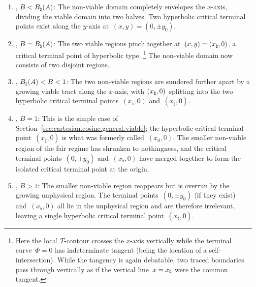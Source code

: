\begin{enumerate}
  \item
    \label{itm:cartesian.cosine.general.cases.gentle}
    , $B < B_\natural (A)$:
    The non-viable domain completely envelopes the $x$-axis,
    dividing the viable domain into two halves.
    Two hyperbolic critical terminal points exist along the $y$-axis
    at~$(x, y) = (0, \pm y_0)$.
  \item
    \label{itm:cartesian.cosine.general.cases.gentle-to-fair}
    , $B = B_\natural (A)$:
    The two viable regions pinch together at~$(x, y) = (x_\natural, 0)$,
    a critical terminal point of hyperbolic type.%
    \footnote{
      Here the local $T$-contour crosses the $x$-axis vertically
      while the terminal curve~$\Phi = 0$ has indeterminate tangent
      (being the location of a self-intersection).
      While the tangency is again debatable,
      two traced boundaries pass through vertically
      as if the vertical line~$x = x_\natural$ were the common tangent.
    }
    The non-viable domain now consists of two disjoint regions.
  \item
    \label{itm:cartesian.cosine.general.cases.fair}
    , $B_\natural (A) < B < 1$:
    The two non-viable regions are sundered further apart
    by a growing viable tract along the $x$-axis,
    with $(x_\natural, 0)$~splitting into the two
    hyperbolic critical terminal points~$(x_\flat, 0)$ and~$(x_\sharp, 0)$.
  \item
    \label{itm:cartesian.cosine.general.cases.fair-to-steep}
    , $B = 1$:
    This is the simple case
    of Section~\ref{sec:cartesian.cosine.general.viable};
    the hyperbolic critical terminal point~$(x_\sharp, 0)$
    is what was formerly called~$(x_0, 0)$.
    The smaller non-viable region of the fair regime
    has shrunken to nothingness,
    and the critical terminal points~$(0, \pm y_0)$ and~$(x_\flat, 0)$
    have merged together
    to form the isolated critical terminal point at the origin.
  \item
    \label{itm:cartesian.cosine.general.cases.steep}
    , $B > 1$:
    The smaller non-viable region
    reappears but is overrun by the growing unphysical region.
    The terminal points~$(0, \pm y_0)$ (if they exist)
    and~$(x_\flat, 0)$ all lie in the unphysical region
    and are therefore irrelevant,
    leaving a single hyperbolic critical terminal point~$(x_\sharp, 0)$.
\end{enumerate}

